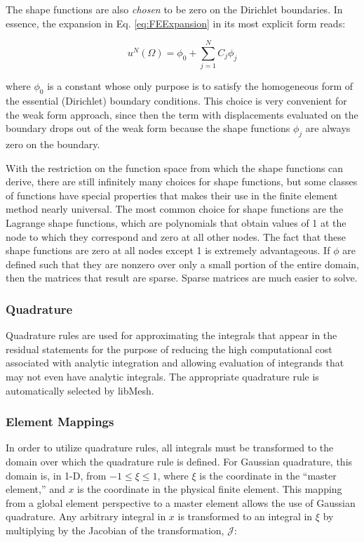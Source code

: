 \documentclass[10pt]{article}
\numberwithin{equation}{section} %
\begin{document}
The shape functions are also \textit{chosen} to be zero on the Dirichlet boundaries. In essence, the expansion in Eq. \eqref{eq:FEExpansion} in its most explicit form reads:

\begin{equation}
u^N(\Omega)=\phi_0+\sum_{j=1}^{N}C_j\phi_j
\end{equation}

where \(\phi_0\) is a constant whose only purpose is to satisfy the homogeneous form of the essential (Dirichlet) boundary conditions. This choice is very convenient for the weak form approach, since then the term with displacements evaluated on the boundary drops out of the weak form because the shape functions \(\phi_j\) are always zero on the boundary. 

With the restriction on the function space from which the shape functions can derive, there are still infinitely many choices for shape functions, but some classes of functions have special properties that makes their use in the finite element method nearly universal. The most common choice for shape functions are the Lagrange shape functions, which are polynomials that obtain values of 1 at the node to which they correspond and zero at all other nodes. The fact that these shape functions are zero at all nodes except 1 is extremely advantageous. If \(\phi\) are defined such that they are nonzero over only a small portion of the entire domain, then the matrices that result are sparse. Sparse matrices are much easier to solve. 

\subsubsection{Quadrature}
\label{sec:Quadrature}

Quadrature rules are used for approximating the integrals that appear in the residual statements for the purpose of reducing the high computational cost associated with analytic integration and allowing evaluation of integrands that may not even have analytic integrals. The appropriate quadrature rule is automatically selected by libMesh.

\subsubsection{Element Mappings}

In order to utilize quadrature rules, all integrals must be transformed to the domain over which the quadrature rule is defined. For Gaussian quadrature, this domain is, in 1-D, from \(-1\leq\xi\leq1\), where \(\xi\) is the coordinate in the ``master element,'' and \(x\) is the coordinate in the physical finite element. This mapping from a global element perspective to a master element allows the use of Gaussian quadrature. Any arbitrary integral in \(x\) is transformed to an integral in \(\xi\) by multiplying by the Jacobian of the transformation, \(\mathscr{J}\):
\end{document}

